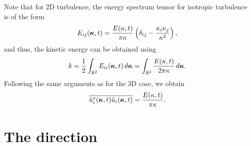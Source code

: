 \documentclass[oneside,a4paper,11pt]{report}
\newcommand{\est}{E}            %
\begin{document}
Note that for 2D turbulence, the energy spectrum tensor for isotropic turbulence is of the form
\begin{equation}
    \est_{ij}(\kvec,t) = \frac{\est(\kappa,t)}{\pi \kappa} \left ( \delta_{ij} - \frac{\kappa_i \kappa_j}{\kappa^2} \right ),
\end{equation}
and thus, the kinetic energy can be obtained using
\begin{equation}
    k = \frac{1}{2} \int_\Rtwo \est_{ii}(\kvec,t) \, d\kvec = \int_\Rtwo \frac{\est(\kappa,t)}{2 \pi \kappa} \, d\kvec.
\end{equation}
Following the same arguments as for the 3D case, we obtain
\begin{equation}
    \overline{ \hat{u}_i^*(\kvec,t) \hat{u}_i(\kvec,t)} = \frac{\est(\kappa,t)}{\pi \kappa}.
\end{equation}

\section{The direction}



\end{document}
